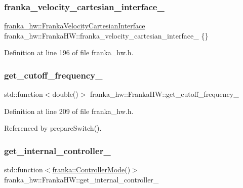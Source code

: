 \subsubsection{\texorpdfstring{franka\+\_\+velocity\+\_\+cartesian\+\_\+interface\+\_\+}{franka\_velocity\_cartesian\_interface\_}}
{\footnotesize\ttfamily \hyperlink{classfranka__hw_1_1FrankaVelocityCartesianInterface}{franka\+\_\+hw\+::\+Franka\+Velocity\+Cartesian\+Interface} franka\+\_\+hw\+::\+Franka\+H\+W\+::franka\+\_\+velocity\+\_\+cartesian\+\_\+interface\+\_\+ \{\}\hspace{0.3cm}{\ttfamily [private]}}



Definition at line 196 of file franka\+\_\+hw.\+h.

\mbox{\label{classfranka__hw_1_1FrankaHW_ada3ea355cd85b06247ee9def60485240}} 
\subsubsection{\texorpdfstring{get\+\_\+cutoff\+\_\+frequency\+\_\+}{get\_cutoff\_frequency\_}}
{\footnotesize\ttfamily std\+::function$<$double()$>$ franka\+\_\+hw\+::\+Franka\+H\+W\+::get\+\_\+cutoff\+\_\+frequency\+\_\+\hspace{0.3cm}{\ttfamily [private]}}



Definition at line 209 of file franka\+\_\+hw.\+h.



Referenced by prepare\+Switch().

\mbox{\label{classfranka__hw_1_1FrankaHW_a0e2aab0e386f9ed57345cd56f02643ac}} 
\subsubsection{\texorpdfstring{get\+\_\+internal\+\_\+controller\+\_\+}{get\_internal\_controller\_}}
{\footnotesize\ttfamily std\+::function$<$\hyperlink{namespacefranka_a3e20bc77587e2c0c53598753e3f4816b}{franka\+::\+Controller\+Mode}()$>$ franka\+\_\+hw\+::\+Franka\+H\+W\+::get\+\_\+internal\+\_\+controller\+\_\+\hspace{0.3cm}{\ttfamily [private]}}



